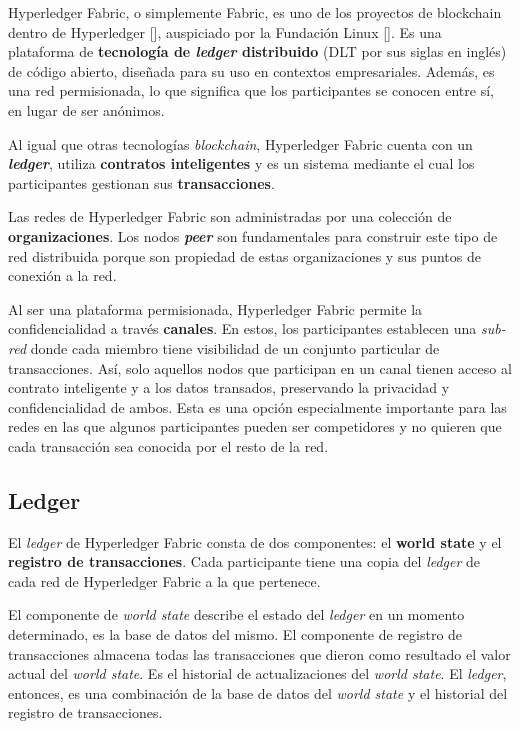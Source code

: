Hyperledger Fabric, o simplemente Fabric, es uno de los proyectos de blockchain dentro de Hyperledger [\cite{hyperledger-foundation}], auspiciado por la Fundación Linux [\cite{linux-foundation}]. Es una plataforma de \textbf{tecnología de \textit{ledger} distribuido} (DLT por sus siglas en inglés) de código abierto, diseñada para su uso en contextos empresariales. Además, es una red permisionada, lo que significa que los participantes se conocen entre sí, en lugar de ser anónimos. 

Al igual que otras tecnologías \textit{blockchain}, Hyperledger Fabric cuenta con un \textit{\textbf{ledger}}, utiliza \textbf{contratos inteligentes} y es un sistema mediante el cual los participantes gestionan sus \textbf{transacciones}.

Las redes de Hyperledger Fabric son administradas por una colección de \textbf{organizaciones}. Los nodos \textit{\textbf{peer}} son fundamentales para construir este tipo de red distribuida porque son propiedad de estas organizaciones y sus puntos de conexión a la red. 

Al ser una plataforma permisionada, Hyperledger Fabric permite la confidencialidad a través \textbf{canales}. En estos, los participantes establecen una \textit{sub-red} donde cada miembro tiene visibilidad de un conjunto particular de transacciones. Así, solo aquellos nodos que participan en un canal tienen acceso al contrato inteligente y a los datos transados, preservando la privacidad y confidencialidad de ambos.
Esta es una opción especialmente importante para las redes en las que algunos participantes pueden ser competidores y no quieren que cada transacción sea conocida por el resto de la red. 


\subsection*{Ledger}

El \textit{ledger} de Hyperledger Fabric consta de dos componentes: el \textbf{world state} y el \textbf{registro de transacciones}. Cada participante tiene una copia del \textit{ledger} de cada red de Hyperledger Fabric a la que pertenece.

El componente de \textit{world state} describe el estado del \textit{ledger} en un momento determinado, es la base de datos del mismo. El componente de registro de transacciones almacena todas las transacciones que dieron como resultado el valor actual del \textit{world state}. Es el historial de actualizaciones del \textit{world state}. El \textit{ledger}, entonces, es una combinación de la base de datos del \textit{world state} y el historial del registro de transacciones.

